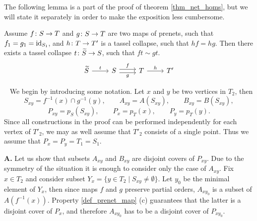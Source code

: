 \documentclass[letterpaper,12pt,leqno]{article}
\numberwithin{equation}{theorem}
\def\PreNet{\textrm{-}\mathrm{PreNet}}
\def\proof{\noindent{\em Proof:}\ }
\begin{document}



The following lemma is a part of the proof of theorem \ref{thm_net_homs}, but we will state it separately in order to make the exposition less cumbersome.

\begin{lemma}
\label{lemma_for_thm_loc}
Assume $f\colon S \to T$ and $g\colon S \to T$ are two maps of prenets, such that $f_1 = g_1 = \mathrm{id}_{S_1}$, and $h\colon T \to T'$ is a tassel collapse, such that $hf = hg$.
Then there exists a tassel collapse $t\colon\widetilde S \to S$, such that $ft \sim gt$.
$$
\begin{tikzcd}
\wtilde S \ar[r, "t"] & S \ar[shift left, r, "f"] \ar[shift right, r, "g"'] & T \ar[r, "h"] & T'
\end{tikzcd}
$$
\end{lemma}
\proof
We begin by introducing some notation. Let $x$ and $y$ be two vertices in $T_2$, then
$$
S_{xy} = f^{-1}(x) \cap g^{-1}(y), \quad\quad A_{xy} = A(S_{xy}), \quad\quad B_{xy} = B(S_{xy}),
$$
$$
P_{xy} = p_S(S_{xy}), \quad\quad P_x = p_T(x), \quad\quad P_y = p_T(y).
$$
Since all constructions in the proof can be performed independently for each vertex of $T'_2$, we may as well assume that $T'_2$ consists of a single point.
Thus we assume that $P_x = P_y = T_1 = S_1$.

{\bf A.} Let us show that subsets $A_{xy}$ and $B_{xy}$ are disjoint covers of $P_{xy}$. Due to the symmetry of the situation it is enough to consider only the case of $A_{xy}$.
Fix $x \in T_2$ and consider subset $Y_x = \{y \in T_2 \mid S_{xy} \neq \emptyset \}$. Let $y_0$ be the minimal element of $Y_x$, then since maps $f$ and $g$ preserve partial orders,
$A_{xy_0}$ is a subset of $A(f^{-1}(x))$. Property \ref{def_prenet_map} (c) guarantees that the latter is a disjoint cover of $P_x$, and therefore $A_{xy_0}$ has to be a disjoint
cover of $P_{xy_0}$.
\end{document}
